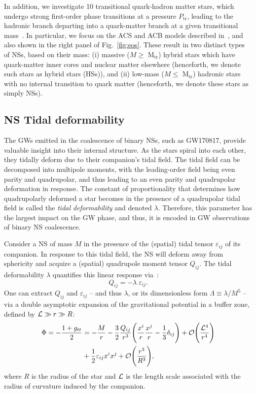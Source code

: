 \documentclass[prd,twocolumn,nofootinbib,superscriptaddress,amsmath,amssymb]{revtex4-1}
\begin{document}
In addition, we investigate 10 transitional quark-hadron matter stars, which undergo strong first-order phase transitions at a pressure $P_{\text{tr}}$, leading to the hadronic branch departing into a quark-matter branch at a given transitional mass~\cite{Paschalidis2018,Alford:2017qgh,1971SvA....15..347S,Zdunik:2012dj,Alford:2013aca}. In particular, we focus on the ACS and ACB models described in~\cite{Paschalidis2018}, and also shown in the right panel of Fig.~\ref{fig:eos}. These result in two distinct types of NSs, based on their mass: (i) massive ($M \geq \text{ M}_{\text{tr}}$) hybrid stars which have quark-matter inner cores and nuclear matter elsewhere (henceforth, we denote such stars as hybrid stars (HSs)), and (ii) low-mass ($M \leq \text{ M}_{\text{tr}}$) hadronic stars with no internal transition to quark matter (henceforth, we denote these stars as simply NSs).

\subsection{NS Tidal deformability}\label{tidal}

The GWs emitted in the coalescence of binary NSs, such as GW170817, provide valuable insight into their internal structure. As the stars spiral into each other, they tidally deform due to their companion's tidal field. The tidal field can be decomposed into multipole moments, with the leading-order field being even parity and quadrupolar, and thus leading to an even parity and quadrupolar deformation in response. The constant of proportionality that determines how quadrupolarly deformed a star becomes in the presence of a quadrupolar tidal field is called the \emph{tidal deformability} and denoted $\lambda$. Therefore, this parameter has the largest impact on the GW phase, and thus, it is encoded in GW observations of binary NS coalescence.  

Consider a NS of mass $M$ in the presence of the (spatial) tidal tensor $\varepsilon_{ij}$ of its companion. In response to this tidal field, the NS will deform away from sphericity and acquire a (spatial) quadrupole moment tensor $Q_{ij}$. The tidal deformability $\lambda$ quantifies this linear response via~\cite{Flanagan2008,hinderer-love,Yagi:ILQ}:
\begin{equation}
Q_{ij}=-\lambda \; \varepsilon_{ij}.
\end{equation}
One can extract $Q_{ij}$ and $\varepsilon_{ij}$ -- and thus $\lambda$, or its dimensionless form $\Lambda \equiv \lambda/M^5$ -- via a double asymptotic expansion of the gravitational potential in a buffer zone, defined by ${\cal{L}} \gg r \gg R$:
\begin{align}
\Phi=- \frac{1+g_{tt}}{2}&=-\frac{M}{r} - \frac{3}{2}\frac{Q_{ij}}{r^3} \Bigg(\frac{x^i}{r} \frac{x^j}{r}-\frac{1}{3}\delta_{ij} \Bigg) + \mathcal{O} \Bigg( \frac{{\cal{L}}^4}{r^4} \Bigg)
\nonumber \\ &+ \frac{1}{2} \varepsilon_{ij} x^i x^j + \mathcal{O} \Bigg( \frac{r^3}{R^3} \Bigg),
\end{align}
where $R$ is the radius of the star and ${\cal{L}}$ is the length scale associated with the radius of curvature induced by the companion. 
\end{document}

